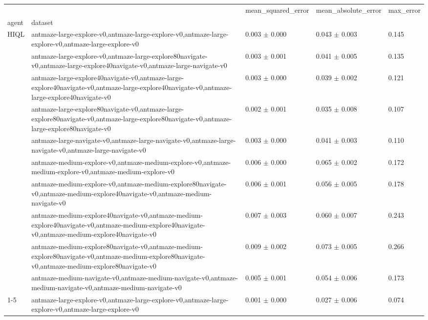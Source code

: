 \begin{tabular}{lllll}
\toprule
 &  & mean_squared_error & mean_absolute_error & max_error \\
agent & dataset &  &  &  \\
\midrule
\multirow[t]{10}{*}{HIQL} & antmaze-large-explore-v0,antmaze-large-explore-v0,antmaze-large-explore-v0,antmaze-large-explore-v0 & 0.003 $\pm$ 0.000 & 0.043 $\pm$ 0.003 & 0.145 \\
 & antmaze-large-explore-v0,antmaze-large-explore80navigate-v0,antmaze-large-explore40navigate-v0,antmaze-large-navigate-v0 & 0.003 $\pm$ 0.001 & 0.041 $\pm$ 0.005 & 0.135 \\
 & antmaze-large-explore40navigate-v0,antmaze-large-explore40navigate-v0,antmaze-large-explore40navigate-v0,antmaze-large-explore40navigate-v0 & 0.003 $\pm$ 0.000 & 0.039 $\pm$ 0.002 & 0.121 \\
 & antmaze-large-explore80navigate-v0,antmaze-large-explore80navigate-v0,antmaze-large-explore80navigate-v0,antmaze-large-explore80navigate-v0 & 0.002 $\pm$ 0.001 & 0.035 $\pm$ 0.008 & 0.107 \\
 & antmaze-large-navigate-v0,antmaze-large-navigate-v0,antmaze-large-navigate-v0,antmaze-large-navigate-v0 & 0.003 $\pm$ 0.000 & 0.041 $\pm$ 0.003 & 0.110 \\
 & antmaze-medium-explore-v0,antmaze-medium-explore-v0,antmaze-medium-explore-v0,antmaze-medium-explore-v0 & 0.006 $\pm$ 0.000 & 0.065 $\pm$ 0.002 & 0.172 \\
 & antmaze-medium-explore-v0,antmaze-medium-explore80navigate-v0,antmaze-medium-explore40navigate-v0,antmaze-medium-navigate-v0 & 0.006 $\pm$ 0.001 & 0.056 $\pm$ 0.005 & 0.178 \\
 & antmaze-medium-explore40navigate-v0,antmaze-medium-explore40navigate-v0,antmaze-medium-explore40navigate-v0,antmaze-medium-explore40navigate-v0 & 0.007 $\pm$ 0.003 & 0.060 $\pm$ 0.007 & 0.243 \\
 & antmaze-medium-explore80navigate-v0,antmaze-medium-explore80navigate-v0,antmaze-medium-explore80navigate-v0,antmaze-medium-explore80navigate-v0 & 0.009 $\pm$ 0.002 & 0.073 $\pm$ 0.005 & 0.266 \\
 & antmaze-medium-navigate-v0,antmaze-medium-navigate-v0,antmaze-medium-navigate-v0,antmaze-medium-navigate-v0 & 0.005 $\pm$ 0.001 & 0.054 $\pm$ 0.006 & 0.173 \\
\cline{1-5}
\multirow[t]{10}{*}{QRL} & antmaze-large-explore-v0,antmaze-large-explore-v0,antmaze-large-explore-v0,antmaze-large-explore-v0 & 0.001 $\pm$ 0.000 & 0.027 $\pm$ 0.006 & 0.074 \\

\end{tabular}
